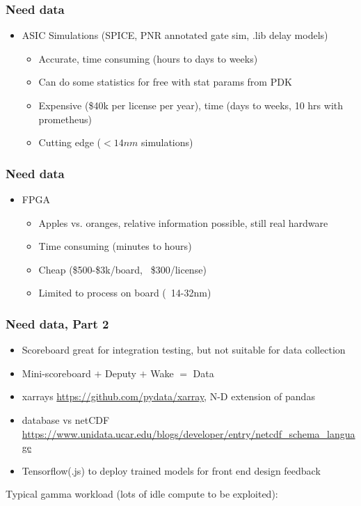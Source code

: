 \documentclass[aspectratio=169]{beamer}
\begin{document}
\begin{frame}
    \frametitle{Need data}
    \begin{itemize}
        \item ASIC Simulations (SPICE, PNR annotated gate sim, .lib delay models)
        \begin{itemize}
            \item Accurate, time consuming (hours to days to weeks)
            \item Can do some statistics for free with stat params from PDK
            \item Expensive (\$40k per license per year), time (days to weeks, 10 hrs with prometheus) 
            \item Cutting edge ($<14nm$ simulations)
        \end{itemize}
    \end{itemize}
\end{frame}
\begin{frame}
    \frametitle{Need data}
    \begin{itemize}
        \item FPGA 
        \begin{itemize}
            \item Apples vs. oranges, relative information possible, still real hardware
            \item Time consuming (minutes to hours)
            \item Cheap (\$500-\$3k/board, ~\$300/license)
            \item Limited to process on board (~14-32nm)
        \end{itemize}
    \end{itemize}
\end{frame}

\begin{frame}
    \frametitle{Need data, Part 2}
    \begin{itemize}
        \item Scoreboard great for integration testing, but not suitable for data collection
        \item Mini-scoreboard $+$ Deputy $+$ Wake $=$ Data
        \item xarrays \url{https://github.com/pydata/xarray}, N-D extension of pandas
        \item database vs netCDF \url{https://www.unidata.ucar.edu/blogs/developer/entry/netcdf_schema_language}
        \item Tensorflow(.js) to deploy trained models for front end design feedback
    \end{itemize}

    Typical gamma workload (lots of idle compute to be exploited):
\end{frame}
\end{document}
